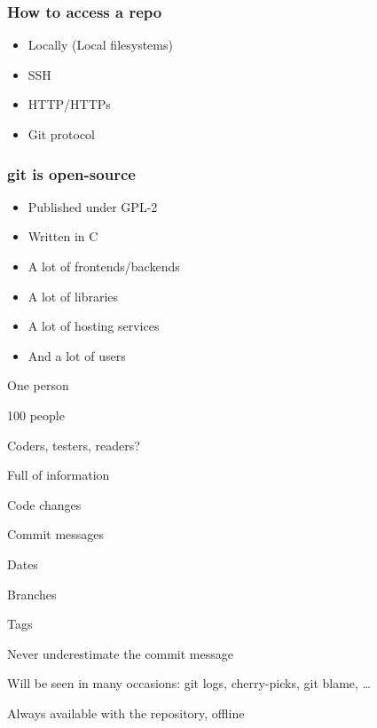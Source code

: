\begin{frame}
    \frametitle{How to access a repo}
    \begin{itemize}
        \item Locally (Local filesystems)
        \item SSH
        \item HTTP/HTTPs
        \item Git protocol
    \end{itemize}
\end{frame}
\begin{frame}
    \frametitle{git is open-source}
    \begin{itemize}
        \item Published under GPL-2\pause
        \item Written in C\pause
        \item A lot of frontends/backends
        \item A lot of libraries
        \item A lot of hosting services
        \item And a lot of users
    \end{itemize}
\end{frame}


\begin{iframe}[A team]
\item One person
\item 100 people
\item Coders, testers, readers?
\end{iframe}

\begin{iframe}
\item Full of information
\item Code changes
\item Commit messages
\item Dates
\item Branches
\item Tags
\end{iframe}




\begin{iframe}
\item Never underestimate the commit message
\item Will be seen in many occasions: git logs, cherry-picks, git blame, \dots
\item Always available with the repository, offline
\end{iframe}

